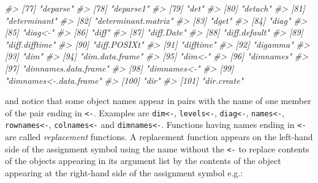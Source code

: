 \documentclass[
]{book}
\newenvironment{Shaded}{\begin{snugshade}}{\end{snugshade}}
\newcommand{\CommentTok}[1]{\textcolor[rgb]{0.56,0.35,0.01}{\textit{#1}}}
\begin{document}
\begin{Shaded}
\begin{Highlighting}[]
\CommentTok{\#\textgreater{}  [77] "deparse"                   }
\CommentTok{\#\textgreater{}  [78] "deparse1"                  }
\CommentTok{\#\textgreater{}  [79] "det"                       }
\CommentTok{\#\textgreater{}  [80] "detach"                    }
\CommentTok{\#\textgreater{}  [81] "determinant"               }
\CommentTok{\#\textgreater{}  [82] "determinant.matrix"        }
\CommentTok{\#\textgreater{}  [83] "dget"                      }
\CommentTok{\#\textgreater{}  [84] "diag"                      }
\CommentTok{\#\textgreater{}  [85] "diag\textless{}{-}"                    }
\CommentTok{\#\textgreater{}  [86] "diff"                      }
\CommentTok{\#\textgreater{}  [87] "diff.Date"                 }
\CommentTok{\#\textgreater{}  [88] "diff.default"              }
\CommentTok{\#\textgreater{}  [89] "diff.difftime"             }
\CommentTok{\#\textgreater{}  [90] "diff.POSIXt"               }
\CommentTok{\#\textgreater{}  [91] "difftime"                  }
\CommentTok{\#\textgreater{}  [92] "digamma"                   }
\CommentTok{\#\textgreater{}  [93] "dim"                       }
\CommentTok{\#\textgreater{}  [94] "dim.data.frame"            }
\CommentTok{\#\textgreater{}  [95] "dim\textless{}{-}"                     }
\CommentTok{\#\textgreater{}  [96] "dimnames"                  }
\CommentTok{\#\textgreater{}  [97] "dimnames.data.frame"       }
\CommentTok{\#\textgreater{}  [98] "dimnames\textless{}{-}"                }
\CommentTok{\#\textgreater{}  [99] "dimnames\textless{}{-}.data.frame"     }
\CommentTok{\#\textgreater{} [100] "dir"                       }
\CommentTok{\#\textgreater{} [101] "dir.create"}
\end{Highlighting}
\end{Shaded}

and notice that some object names appear in pairs with the name of one member of the pair ending in \texttt{\textless{}-}. Examples are \texttt{dim\textless{}-}, \texttt{levels\textless{}-}, \texttt{diag\textless{}-}, \texttt{names\textless{}-}, \texttt{rownames\textless{}-}, \texttt{colnames\textless{}-} and \texttt{dimnames\textless{}-}. Functions having names ending in \texttt{\textless{}-} are called \emph{{replacement}} functions. A replacement function appears on the left-hand side of the assignment symbol using the name without the \texttt{\textless{}-} to replace contents of the objects appearing in its argument list by the contents of the object appearing at the right-hand side of the assignment symbol e.g.:
\end{document}
